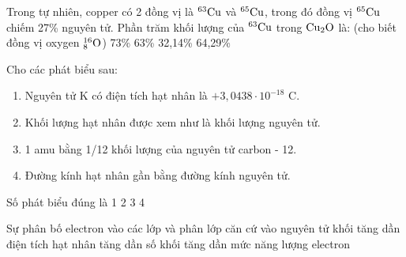 \documentclass[12pt,a4paper]{article}
\renewcommand{\loigiai}[1]{}
\renewcommand{\True}{}
\begin{document}
\begin{ex}
Trong tự nhiên, copper có 2 đồng vị là $^{63}\ce{Cu}$ và $^{65}\ce{Cu}$, trong đó đồng vị $^{65}\ce{Cu}$ chiếm 27\% nguyên tử. Phần trăm khối lượng của $^{63}\ce{Cu}$ trong $\ce{Cu2O}$ là: (cho biết đồng vị oxygen $^{16}_8\ce{O}$)
\choice
{73\%}
{63\%}
{32{,}14\%}
{\True 64{,}29\%}
\loigiai{
Phần trăm số nguyên tử của đồng vị $^{63}\ce{Cu}$: $100\% - 27\% = 73\%$.\\
Nguyên tử khối trung bình của copper:
\[\overline{A}_{\ce{Cu}} = \dfrac{63 \times 73 + 65 \times 27}{100} = 63{,}54.\]
Phân tử khối của $\ce{Cu2O}$: $M = 2 \times 63{,}54 + 16 = 143{,}08\text{ g/mol}$.\\
Trong 1 mol $\ce{Cu2O}$ có 2 mol Cu, khối lượng đồng vị $^{63}\ce{Cu}$ là $2 \times 73\% \times 63 = 91{,}98\text{ gam}$.\\
Phần trăm khối lượng của $^{63}\ce{Cu}$ trong $\ce{Cu2O}$ là:
\[\%m_{^{63}\ce{Cu}} = \dfrac{91{,}98}{143{,}08} \times 100\% \approx 64{,}29\%.\]
\textbf{Chọn D.}
}
\end{ex}

\begin{ex}
Cho các phát biểu sau:
\begin{enumerate}[(1)]
	\item Nguyên tử K có điện tích hạt nhân là $+3{,}0438 \cdot 10^{-18}\text{ C}$.
	\item Khối lượng hạt nhân được xem như là khối lượng nguyên tử.
	\item 1 amu bằng 1/12 khối lượng của nguyên tử carbon - 12.
	\item Đường kính hạt nhân gần bằng đường kính nguyên tử.
\end{enumerate}
Số phát biểu đúng là
\choice
{1}
{2}
{\True 3}
{4}
\loigiai{
(1) Đúng: Nguyên tử K có $Z = 19$, điện tích hạt nhân $q = +19 \times 1{,}602 \cdot 10^{-19}\text{ C} = +3{,}0438 \cdot 10^{-18}\text{ C}$.\\
(2) Đúng: Khối lượng electron rất nhỏ không đáng kể so với proton và neutron nên khối lượng hạt nhân được coi là khối lượng nguyên tử.\\
(3) Đúng: Định nghĩa 1 amu bằng 1/12 khối lượng nguyên tử carbon-12.\\
(4) Sai: Đường kính nguyên tử lớn hơn đường kính hạt nhân khoảng 10 000 lần.\\
Số phát biểu đúng là 3 gồm (1), (2), (3).\\
\textbf{Chọn C.}
}
\end{ex}

\begin{ex}
Sự phân bố electron vào các lớp và phân lớp căn cứ vào
\choice
{nguyên tử khối tăng dần}
{điện tích hạt nhân tăng dần}
{số khối tăng dần}
{\True mức năng lượng electron}
\loigiai{
Theo nguyên lý vững bền, các electron trong nguyên tử lần lượt chiếm các mức năng lượng từ thấp đến cao.\\
\textbf{Chọn D.}
}
\end{ex}
\end{document}

